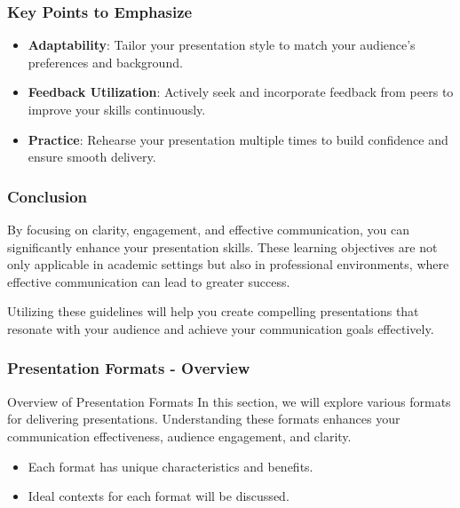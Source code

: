 \documentclass[aspectratio=169]{beamer}
\begin{document}
\begin{frame}[fragile]
    \frametitle{Key Points to Emphasize}
    \begin{itemize}
        \item \textbf{Adaptability}: Tailor your presentation style to match your audience’s preferences and background.
        \item \textbf{Feedback Utilization}: Actively seek and incorporate feedback from peers to improve your skills continuously.
        \item \textbf{Practice}: Rehearse your presentation multiple times to build confidence and ensure smooth delivery.
    \end{itemize}
\end{frame}

\begin{frame}[fragile]
    \frametitle{Conclusion}
    By focusing on clarity, engagement, and effective communication, you can significantly enhance your presentation skills. These learning objectives are not only applicable in academic settings but also in professional environments, where effective communication can lead to greater success.
    
    Utilizing these guidelines will help you create compelling presentations that resonate with your audience and achieve your communication goals effectively.
\end{frame}

\begin{frame}[fragile]
    \frametitle{Presentation Formats - Overview}
    \begin{block}{Overview of Presentation Formats}
        In this section, we will explore various formats for delivering presentations. Understanding these formats enhances your communication effectiveness, audience engagement, and clarity.
    \end{block}
    \begin{itemize}
        \item Each format has unique characteristics and benefits.
        \item Ideal contexts for each format will be discussed.
    \end{itemize}
\end{frame}
\end{document}
